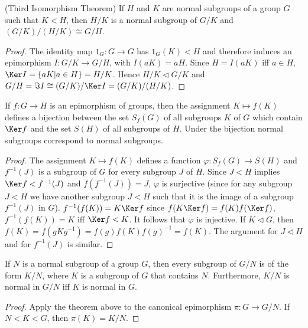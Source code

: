 \begin{Corollary}(Third Isomorphism Theorem)
	If $ H $ and $ K $ are normal subgroups of a group $ G $ such that $ K<H $, then $ H /K $ is a normal subgroup of $ G/K $ and $ (G/K)/(H/K)\cong G/H $.
\end{Corollary}
\begin{proof}
	The identity map $ 1_G:G \to G $ has $ 1_G(K)<H $ and therefore induces an epimorphism $ I:G/K \to G/H $, with $ I(aK)=aH $. Since $ H=I(aK) $ iff $ a \in H $, $ \Ker I = \{aK|a \in H \}=H/K $. Hence $ H/K \vartriangleleft G/K $ and $ G/H=\Im I \cong (G/K)/\Ker I = (G/K)/(H/K) $.
\end{proof}
\begin{Theorem}
	If $ f:G \to H $ is an epimorphism of groups, then the assignment $ K \mapsto f(K) $ defines a bijection between the set $ S_f(G) $ of all subgroups $ K $ of $ G $ which contain $ \Ker f $ and the set $ S(H) $ of all subgroups of $ H $. Under the bijection normal subgroups correspond to normal subgroups.
\end{Theorem}
\begin{proof}
	The assignment $ K \mapsto f(K)$ defines a function $ \varphi: S_f(G)\to S(H) $ and $ f^{-1}(J) $ is a subgroup of $ G $ for every subgroup $ J $ of $ H $. Since $ J<H $ implies $ \Ker f <f^{-1}(J) $ and $ f(f^{-1}(J))=J $, $ \varphi $ is surjective (since for any subgroup $ J<H $ we have another subgroup $ J<H $ such that it is the image of a subgroup $ f^{-1}(J) $ in $ G $). $ f^{-1}(f(K))=K \Ker f $ since $ f(K \Ker f )=f(K) f(\Ker f) $, $ f^{-1}(f(K))=K $ iff $ \Ker f <K $. It follows that $ \varphi $ is injective. If $ K \vartriangleleft G $, then $ f(K) = f(gKg^{-1})=f(g)f(K)f(g)^{-1}= f(K) $. The argument for $ J \vartriangleleft H$ and for $ f^{-1}(J) $ is similar.
\end{proof}

\begin{Corollary}
	If $ N $ is a normal subgroup of a group $ G $, then every subgroup of $ G/N $ is of the form $ K/N $, where $ K $ is a subgroup of $ G $ that contains $ N $. Furthermore, $ K/N $ is normal in $ G/N $ iff $ K $ is normal in $ G $.
\end{Corollary}
\begin{proof}
	Apply the theorem above to the canonical epimorphism $ \pi :G\to G/N $. If $ N<K<G $, then $ \pi(K)=K/N $.
\end{proof}










